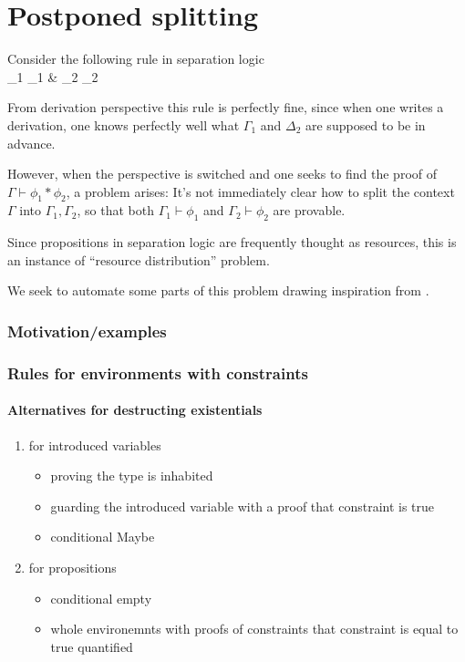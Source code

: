\chapter{Postponed splitting}

Consider the following rule in separation logic\\

      {\Gamma_1 \vdash \phi_1 &
       \Gamma_2 \vdash \phi_2}

From derivation perspective this rule is perfectly fine, since when one writes a derivation, one knows perfectly well what $\Gamma_1$ and $\Delta_2$ are supposed to be in advance.

However, when the perspective is switched and one seeks to find the proof of $\Gamma \vdash \phi_1 \ast \phi_2$, a problem arises:
It's not immediately clear how to split the context $\Gamma$ into $\Gamma_1, \Gamma_2$, so that both $\Gamma_1 \vdash \phi_1$ and $\Gamma_2 \vdash \phi_2$ are provable.

Since propositions in separation logic are frequently thought as resources, this is an instance of ``resource distribution'' problem.

We seek to automate some parts of this problem drawing inspiration from \cite{Harland_Pym_2003}.

\subsection{Motivation/examples}



\subsection{Rules for environments with constraints}

\subsubsection{Alternatives for destructing existentials}

\begin{enumerate}
\item for introduced variables

\begin{itemize}
\item proving the type is inhabited
\item guarding the introduced variable with a proof that constraint is true
\item conditional Maybe
\end{itemize}
\item for propositions

\begin{itemize}
\item conditional empty
\item whole environemnts with proofs of constraints that constraint is equal to true quantified
\end{itemize}
\end{enumerate}
